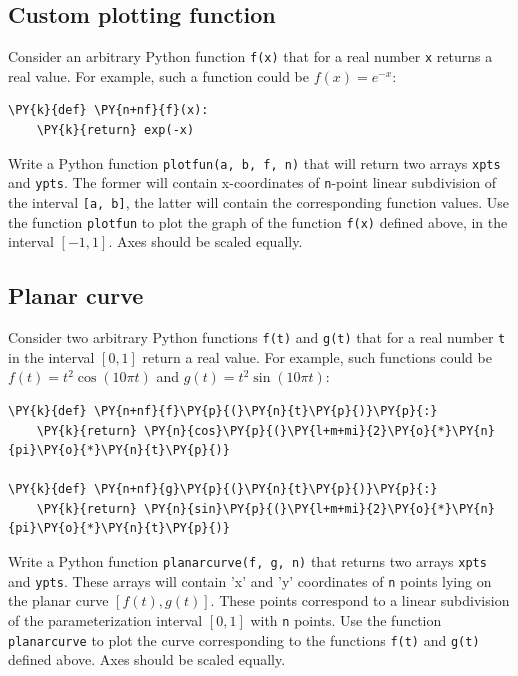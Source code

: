 
\subsection{Custom plotting function}

Consider an arbitrary Python function {\tt f(x)} that for a real number 
{\tt x} returns a real value. For example, such a function could be 
$f(x) = e^{-x}$:

\begin{Verbatim}[commandchars=\\\{\}]
\PY{k}{def} \PY{n+nf}{f}(x):
    \PY{k}{return} exp(-x)
\end{Verbatim}
Write a Python function {\tt plotfun(a, b, f, n)} that will return two
arrays {\tt xpts} and {\tt ypts}. The former will contain x-coordinates of 
{\tt n}-point linear subdivision of the interval {\tt [a, b]}, the latter will
contain the corresponding function values. Use the function {\tt plotfun} to
plot the graph of the function {\tt f(x)} defined above, in the interval $[-1, 1]$.
Axes should be scaled equally.


\subsection{Planar curve}

Consider two arbitrary Python functions {\tt f(t)} and {\tt g(t)} that 
for a real number {\tt t} in the interval $[0, 1]$ return a real value. 
For example, such functions could be $f(t) = t^2 \cos(10 \pi t)$ and 
$g(t) = t^2 \sin(10 \pi t)$:

\begin{Verbatim}[commandchars=\\\{\}]
\PY{k}{def} \PY{n+nf}{f}\PY{p}{(}\PY{n}{t}\PY{p}{)}\PY{p}{:}
    \PY{k}{return} \PY{n}{cos}\PY{p}{(}\PY{l+m+mi}{2}\PY{o}{*}\PY{n}{pi}\PY{o}{*}\PY{n}{t}\PY{p}{)}

\PY{k}{def} \PY{n+nf}{g}\PY{p}{(}\PY{n}{t}\PY{p}{)}\PY{p}{:}
    \PY{k}{return} \PY{n}{sin}\PY{p}{(}\PY{l+m+mi}{2}\PY{o}{*}\PY{n}{pi}\PY{o}{*}\PY{n}{t}\PY{p}{)}
\end{Verbatim}
Write a Python function {\tt planarcurve(f, g, n)} that returns two
arrays {\tt xpts} and {\tt ypts}. These arrays will contain 'x' and 'y' coordinates of 
{\tt n} points lying on the planar curve $[f(t), g(t)]$. These points 
correspond to a linear subdivision of the parameterization interval 
$[0, 1]$ with {\tt n} points. Use the function {\tt planarcurve} to
plot the curve corresponding to the functions {\tt f(t)} and {\tt g(t)} 
defined above. Axes should be scaled equally.

